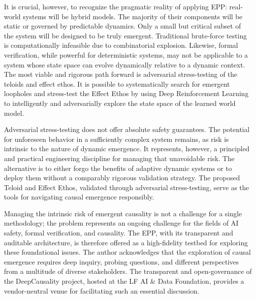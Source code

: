 It is crucial, however, to recognize the pragmatic reality of applying EPP: real-world systems will be hybrid models. The majority of their components will be static or governed by predictable dynamics. Only a small but critical subset of the system will be designed to be truly emergent.
Traditional brute-force testing is computationally infeasible due to combinatorial explosion. 
Likewise, formal verification, while powerful for deterministic systems, may not be applicable to a system whose state space can evolve dynamically relative to a dynamic context.
The most viable and rigorous path forward is adversarial stress-testing of the teloids and effect ethos. 
It is possible to systematically search for emergent loopholes and stress-test the Effect Ethos
by using Deep Reinforcement Learning to intelligently and adversarially explore the state space of the learned world model.

Adversarial stress-testing  does not offer absolute safety guarantees. The potential for unforeseen behavior in a sufficiently complex system remains, as risk is intrinsic to the nature of dynamic emergence. It represents, however, a principled and practical engineering discipline for managing that unavoidable risk. 
The alternative is to either forgo the benefits of adaptive dynamic systems or to deploy them without a comparably rigorous validation strategy. 
The proposed Teloid and Effect Ethos, validated through adversarial stress-testing, serve as the tools for navigating causal emergence responsibly.

Managing the intrinsic risk of emergent causality is not a challenge for a single methodology; the problem represents an ongoing challenge for the fields of AI safety, formal verification, and causality. The EPP, with its transparent and auditable architecture, is therefore offered as a high-fidelity testbed for exploring these foundational issues. 
The author acknowledges that the exploration of causal emergence requires deep inquiry, probing questions, and different perspectives from a multitude of diverse stakeholders. 
The transparent and open-governance of the DeepCausality project, hosted at the LF AI \& Data Foundation, provides a vendor-neutral venue for facilitating such an essential discussion.

\newpage
